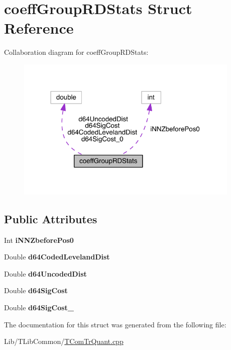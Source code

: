 \hypertarget{structcoeff_group_r_d_stats}{}\section{coeff\+Group\+R\+D\+Stats Struct Reference}
\label{structcoeff_group_r_d_stats}


Collaboration diagram for coeff\+Group\+R\+D\+Stats\+:
\nopagebreak
\begin{figure}[H]
\begin{center}
\leavevmode
\includegraphics[width=303pt]{dc/d47/structcoeff_group_r_d_stats__coll__graph}
\end{center}
\end{figure}
\subsection*{Public Attributes}
\begin{DoxyCompactItemize}
\item 
\mbox{\label{structcoeff_group_r_d_stats_a38af0953e58b813f269807b50d74d86c}} 
Int {\bfseries i\+N\+N\+Zbefore\+Pos0}
\item 
\mbox{\label{structcoeff_group_r_d_stats_a77d4db46c9636552883fc3e17ef4a56f}} 
Double {\bfseries d64\+Coded\+Leveland\+Dist}
\item 
\mbox{\label{structcoeff_group_r_d_stats_a530b4ab91fb7119f670547c791cd2861}} 
Double {\bfseries d64\+Uncoded\+Dist}
\item 
\mbox{\label{structcoeff_group_r_d_stats_a4eb5b7e1cdfa8c2dce3e568fe75e96c6}} 
Double {\bfseries d64\+Sig\+Cost}
\item 
\mbox{\label{structcoeff_group_r_d_stats_a696e1f8b2e5cbddae21bf22c2056e06a}} 
Double {\bfseries d64\+Sig\+Cost\+\_}
\end{DoxyCompactItemize}


The documentation for this struct was generated from the following file\+:\begin{DoxyCompactItemize}
\item 
Lib/\+T\+Lib\+Common/\hyperlink{_t_com_tr_quant_8cpp}{T\+Com\+Tr\+Quant.\+cpp}\end{DoxyCompactItemize}
